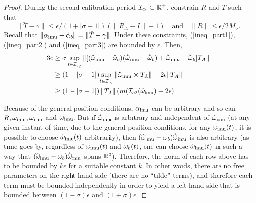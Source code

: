 \begin{proof}
\bigskip
During the second calibration period $\mathcal{I}_{c_2}\subset\mathbb{R}^+$, constrain $R$ and $T$ such that
$$\|\ddot T-\gamma\|\leq\epsilon/(1+|\sigma-1|)(\|R_A-I\|+1)\quad\text{and}\quad
\|\ddot R\|\leq\epsilon/2M_\sigma.$$
Recall that $\|\dot\alpha_\mathrm{imu}-\dot\alpha_b\| = \|\ddot T-\gamma\|$.  Under these constraints, 
(\ref{ineq_part1}), (\ref{ineq_part2}) and (\ref{ineq_part3}) are bounded by $\epsilon$.  Then,
\begin{align*}
3\epsilon &\geq\sigma\sup_{t\in\mathcal{I}_{c_2}}\|[({\widehat{\omega}}_\mathrm{imu}  - {\widehat{\omega}}_b)(\dot{{\widehat{\omega}}}_\mathrm{imu}  - \dot{{\widehat{\omega}}}_b) + \ddot{{\widehat{\omega}}}_\mathrm{imu}  - \ddot{{\widehat{\omega}}}_b ] T_A\|\\
&\geq(1-|\sigma-1|)\!\sup_{t\in\mathcal{I}_{c_2}}\|\ddot{\omega}_\mathrm{imu}\times T_A\| - 2\epsilon\|T_A\|\\
&\geq(1-|\sigma-1|)\,\|T_A\|\,({m}({\mathcal{I}_{c2}}(\ddot{\omega}_\mathrm{imu}) - 2\epsilon)
\end{align*}



Because of the general-position conditions, $\alpha_\mathrm{imu} $ can be arbitrary and so can $R, \omega_\mathrm{imu} , {\dot {\omega}}_\mathrm{imu} $ and ${\ddot {\omega}}_\mathrm{imu} $. But if $\dot {{\widehat{\omega}}}_\mathrm{imu} $ is arbitrary and independent of ${\widehat{\omega}}_\mathrm{imu} $ (at any given instant of time, due to the general-position conditions, for any $\omega_\mathrm{imu} (t)$, it is possible to choose $\dot {\omega}_\mathrm{imu} (t)$ arbitrarily), then $({\widehat{\omega}}_\mathrm{imu} -\omega_b)\dot{{\widehat{\omega}}}_\mathrm{imu} $ is also arbitrary (as time goes by, regardless of $\omega_\mathrm{imu} (t)$ and $\omega_b(t)$, one can choose $\dot {\omega}_\mathrm{imu} (t)$ in such a way that $({\widehat{\omega}}_\mathrm{imu} -\omega_b)\dot{{\widehat{\omega}}}_\mathrm{imu} $ spans $\mathbb{R}^3$). Therefore, the norm of each row above has to be bounded by $k\epsilon$ for a suitable constant $k$. In other words, there are no free parameters on the right-hand side (there are no ``tilde'' terms), and therefore each term must be bounded independently in order to yield a left-hand side that is bounded 
between $(1 - \sigma)\epsilon$ and $(1 + \sigma)\epsilon$. 


\end{proof}
